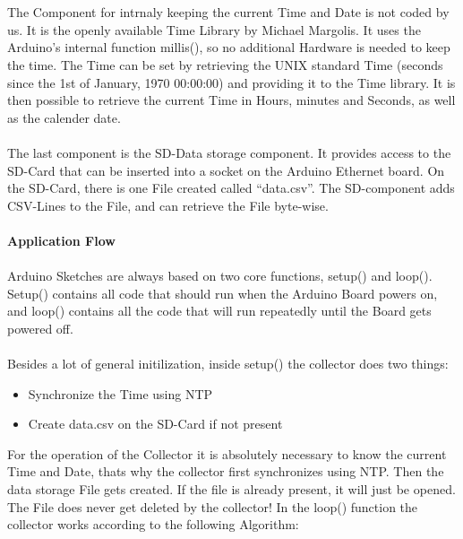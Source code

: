 \documentclass[
	11pt,
	a4paper
]{article}%
\begin{document}
\\\\
The Component for intrnaly keeping the current Time and Date is not coded by us. It is the openly available Time Library by Michael Margolis. It uses the Arduino's internal function millis(), so no additional Hardware is needed to keep the time. The Time can be set by retrieving the UNIX standard Time (seconds since the 1st of January, 1970 00:00:00) and providing it to the Time library. It is then possible to retrieve the current Time in Hours, minutes and Seconds, as well as the calender date.
\\\\
The last component is the SD-Data storage component. It provides access to the SD-Card that can be inserted into a socket on the Arduino Ethernet board. On the SD-Card, there is one File created called “data.csv”. The SD-component adds CSV-Lines to the File, and can retrieve the File byte-wise.
\\\\
\textbf{Application Flow}\\\\
Arduino Sketches are always based on two core functions, setup() and loop(). Setup() contains all code that should run when the Arduino Board powers on, and loop() contains all the code that will run repeatedly until the Board gets powered off.
\\\\
Besides a lot of general initilization, inside setup() the collector does two things:
\begin{itemize}
\item Synchronize the Time using NTP
\item Create data.csv on the SD-Card if not present
\end{itemize}
For the operation of the Collector it is absolutely necessary to know the current Time and Date, thats why the collector first synchronizes using NTP. Then the data storage File gets created. If the file is already present, it will just be opened. The File does never get deleted by the collector!
\newpage
In the loop() function the collector works according to the following Algorithm:
\end{document}

